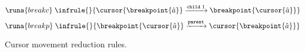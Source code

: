 \begin{table}[H]
\begin{adjmulticols}{3}{-56pt}{-1in}
    \end{adjmulticols}
    \vspace*{-1.5cm}
    \begin{adjmulticols}{2}{-20pt}{-1in}
    \begin{equation*}
        \runa{breakc}\; \infrule{}{\cursor{\breakpoint{\hat{a}}} \xrightarrow{\texttt{child}\; 1} \breakpoint{\cursor{\hat{a}}}}
    \end{equation*} \break
    \begin{equation*}
        \runa{breakp}\; \infrule{}{\breakpoint{\cursor{\hat{a}}} \xrightarrow{\texttt{parent}} \cursor{\breakpoint{\hat{a}}}}
    \end{equation*}
    \end{adjmulticols}
    \caption{Cursor movement reduction rules.}
    \label{tab:CMsem}
\end{table}

